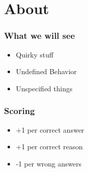 \section{About}
\begin{frame}
  \frametitle{What we will see}
  \begin{itemize}
      \item Quirky stuff
      \item Undefined Behavior
      \item Unspecified things
  \end{itemize}
\end{frame}
\begin{frame}
  \frametitle{Scoring}
  \begin{itemize}
      \item +1 per correct answer
      \item +1 per correct reason
      \item -1 per wrong answers
  \end{itemize}
\end{frame}
